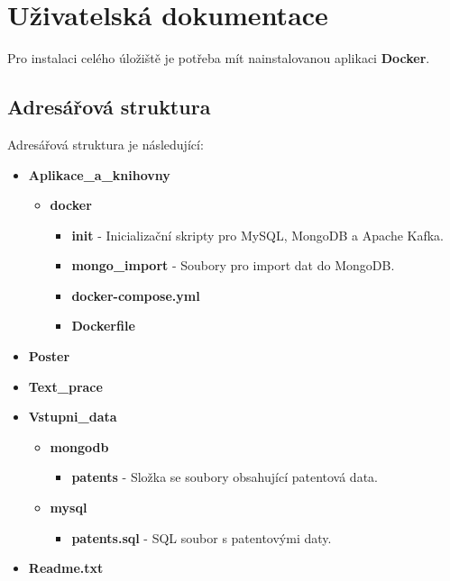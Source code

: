 \chapter{Uživatelská dokumentace}  \label{chap:uziv_doc}
Pro instalaci celého úložiště je potřeba mít nainstalovanou aplikaci \textbf{Docker}.

\section{Adresářová struktura}
Adresářová struktura je následující:
\begin{itemize}
\item \textbf{Aplikace\_a\_knihovny}
	\begin{itemize}
	\item \textbf{docker}
		\begin{itemize}
		\item \textbf{init} - Inicializační skripty pro MySQL, MongoDB a Apache Kafka.
		\item \textbf{mongo\_import} - Soubory pro import dat do MongoDB.
		\item \textbf{docker-compose.yml}
		\item \textbf{Dockerfile}
		\end{itemize}
	\end{itemize}
\item \textbf{Poster}
\item \textbf{Text\_prace}
\item \textbf{Vstupni\_data}
	\begin{itemize}
	\item \textbf{mongodb}
		\begin{itemize}
		\item \textbf{patents} - Složka se soubory obsahující patentová data.
		\end{itemize}
	\item \textbf{mysql}
		\begin{itemize}
		\item \textbf{patents.sql} - SQL soubor s patentovými daty.
		\end{itemize}
	\end{itemize}
\item \textbf{Readme.txt}
\end{itemize}
\newpage
